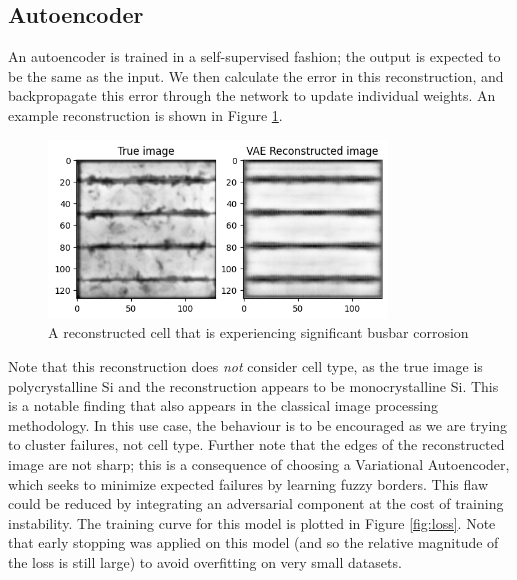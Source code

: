 \documentclass[conference]{IEEEtran}
\begin{document}
\subsection{Autoencoder}
An autoencoder is trained in a self-supervised fashion; the output is expected to be the same as the input. 
We then calculate the error in this reconstruction, and backpropagate this error through the network to update individual weights. 
An example reconstruction is shown in Figure \ref{fig:recon}.

\begin{figure}[h]
    \includegraphics[width=9cm]{recon.png}
    \centering
    \caption{A reconstructed cell that is experiencing significant busbar corrosion}
\label{fig:recon}
\end{figure}
Note that this reconstruction does \textit{not} consider cell type, as the true image is polycrystalline Si and the reconstruction appears to be monocrystalline Si. 
This is a notable finding that also appears in the classical image processing methodology. 
In this use case, the behaviour is to be encouraged as we are trying to cluster failures, not cell type. 
Further note that the edges of the reconstructed image are not sharp; this is a consequence of choosing a Variational Autoencoder, which seeks to minimize expected failures by learning fuzzy borders. 
This flaw could be reduced by integrating an adversarial component at the cost of training instability. 
The training curve for this model is plotted in Figure \ref{fig:loss}. 
Note that early stopping was applied on this model (and so the relative magnitude of the loss is still large) to avoid overfitting on very small datasets. 
\end{document}
